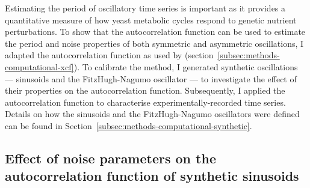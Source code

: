 Estimating the period of oscillatory time series is important as it provides a quantitative measure of how yeast metabolic cycles respond to genetic nutrient perturbations.
To show that the autocorrelation function can be used to estimate the period and noise properties of both symmetric and asymmetric oscillations, I adapted the autocorrelation function as used by \textcite{pietschDeterminingGrowthRates2023} (section~\ref{subsec:methods-computational-xcf}).
To calibrate the method, I generated synthetic oscillations --- sinusoids and the FitzHugh-Nagumo oscillator \parencite{fitzhughImpulsesPhysiologicalStates1961} --- to investigate the effect of their properties on the autocorrelation function.
Subsequently, I applied the autocorrelation function to characterise experimentally-recorded time series.
Details on how the sinusoids and the FitzHugh-Nagumo oscillators were defined can be found in Section~\ref{subsec:methods-computational-synthetic}.

\subsection{Effect of noise parameters on the autocorrelation function of synthetic sinusoids}
\label{subsec:analysis-characterisation-acf-sinusoid}


